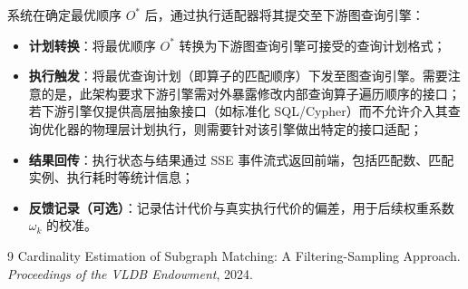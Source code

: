 \documentclass[12pt,a4paper]{article}
\begin{document}
系统在确定最优顺序 $O^*$ 后，通过执行适配器将其提交至下游图查询引擎：
\begin{itemize}
  \item \textbf{计划转换}：将最优顺序 $O^*$ 转换为下游图查询引擎可接受的查询计划格式；
  \item \textbf{执行触发}：将最优查询计划（即算子的匹配顺序）下发至图查询引擎。需要注意的是，此架构要求下游引擎需对外暴露修改内部查询算子遍历顺序的接口；若下游引擎仅提供高层抽象接口（如标准化 SQL/Cypher）而不允许介入其查询优化器的物理层计划执行，则需要针对该引擎做出特定的接口适配；
  \item \textbf{结果回传}：执行状态与结果通过 SSE 事件流式返回前端，包括匹配数、匹配实例、执行耗时等统计信息；
  \item \textbf{反馈记录（可选）}：记录估计代价与真实执行代价的偏差，用于后续权重系数 $\omega_k$ 的校准。
\end{itemize}


\begin{thebibliography}{9}
  Cardinality Estimation of Subgraph Matching: A Filtering-Sampling Approach.
  \textit{Proceedings of the VLDB Endowment}, 2024.
\end{thebibliography}
\end{document}
